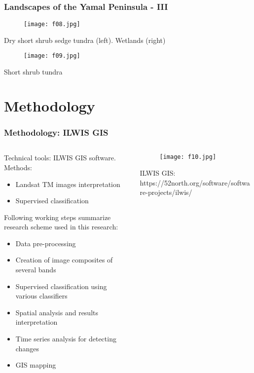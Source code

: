 \documentclass[pdflatex,compress,8pt,
	xcolor={dvipsnames,dvipsnames,svgnames,x11names,table},
	hyperref={colorlinks = true,breaklinks = true, urlcolor = NavyBlue, breaklinks = true}]{beamer}
\begin{document}
\begin{frame}\frametitle{Landscapes of the Yamal Peninsula - III}
\begin{figure}[H]
	\centering
		\texttt{[image: f08.jpg]}
\end{figure}
Dry short shrub sedge tundra (left). Wetlands (right)
\begin{figure}[H]
	\centering
		\texttt{[image: f09.jpg]}
\end{figure}
Short shrub tundra
\end{frame}

\section{Methodology}
\begin{frame}\frametitle{Methodology: ILWIS GIS}
\begin{minipage}[0.4\textheight]{\textwidth}
\begin{columns}[T]
\begin{column}{0.6\textwidth}
Technical tools: ILWIS GIS software. Methods: 
\begin{itemize}
	\item Landsat TM images interpretation
	\item Supervised classification
\end{itemize}
Following working steps summarize research scheme used in this research:
\begin{itemize}
	\item Data pre-processing
	\item Creation of image composites of several bands
	\item Supervised classification using various classifiers 
	\item Spatial analysis and results interpretation
	\item Time series analysis for detecting changes
	\item GIS mapping
\end{itemize}
\end{column}
\begin{column}{0.4\textwidth}
\begin{figure}[H]
	\centering
		\texttt{[image: f10.jpg]}
\end{figure}
ILWIS GIS: https://52north.org/software/software-projects/ilwis/
\end{column}
\end{columns}
\end{minipage}
\end{frame}
\end{document}
